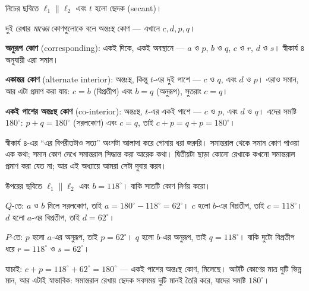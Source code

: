 \documentclass[11pt]{article}
\begin{document}
\begin{idea}[ছেদক ও সমান্তরাল রেখা]
নিচের ছবিতে $\ell_1 \parallel \ell_2$ এবং $t$ হলো ছেদক (secant)।

\begin{center}
\end{center}

\noindent
দুই রেখার \emph{মাঝের} কোণগুলোকে বলে অন্তঃস্থ কোণ --- এখানে $c, d, p, q$।

\textbf{অনুরূপ কোণ} (corresponding): একই দিকে, একই অবস্থানে --- $a$ ও $p$,
$b$ ও $q$, $c$ ও $r$, $d$ ও $s$। স্বীকার্য ৪ অনুযায়ী এরা সমান।

\textbf{একান্তর কোণ} (alternate interior): অন্তঃস্থ, কিন্তু $t$-এর দুই পাশে ---
$c$ ও $q$, এবং $d$ ও $p$। এরাও সমান, আর এটা প্রমাণ করা যায়: $c = b$ (বিপ্রতীপ)
এবং $b = q$ (অনুরূপ), সুতরাং $c = q$।

\textbf{একই পাশের অন্তঃস্থ কোণ} (co-interior): অন্তঃস্থ, $t$-এর একই পাশে ---
$c$ ও $p$, এবং $d$ ও $q$। এদের সমষ্টি $180^\circ$: $p + q = 180^\circ$ (সরলকোণ)
এবং $c = q$, তাই $c + p = q + p = 180^\circ$।
\end{idea}

\begin{remark}
স্বীকার্য ৪-এর ``এর বিপরীতটাও সত্য'' অংশটা আলাদা করে গোনায় ধরা জরুরি। সমান্তরাল
থেকে সমান কোণ পাওয়া এক কথা; সমান কোণ দেখে সমান্তরাল সিদ্ধান্ত করা আরেক কথা।
দ্বিতীয়টা ছাড়া কোনো রেখাকে কখনো সমান্তরাল প্রমাণ করা যেত না; আর এই অধ্যায়ে
আমরা সেটা দুবার করব।
\end{remark}

\begin{example}
উপরের ছবিতে $\ell_1 \parallel \ell_2$ এবং $b = 118^\circ$। বাকি সাতটি কোণ
নির্ণয় করো।
\end{example}

\begin{solbox}
$Q$-তে: $a$ ও $b$ মিলে সরলকোণ, তাই $a = 180^\circ - 118^\circ = 62^\circ$।
$c$ হলো $b$-এর বিপ্রতীপ, তাই $c = 118^\circ$। $d$ হলো $a$-এর বিপ্রতীপ, তাই
$d = 62^\circ$।

$P$-তে: $p$ হলো $a$-এর অনুরূপ, তাই $p = 62^\circ$। $q$ হলো $b$-এর অনুরূপ, তাই
$q = 118^\circ$। বাকি দুটো বিপ্রতীপ ধরে $r = 118^\circ$ ও $s = 62^\circ$।

যাচাই: $c + p = 118^\circ + 62^\circ = 180^\circ$ --- একই পাশের অন্তঃস্থ কোণ,
মিলেছে। আটটি কোণের মাত্র দুটি ভিন্ন মান, আর এটাই স্বাভাবিক: সমান্তরাল রেখায়
ছেদক সবসময় দুটি মানই তৈরি করে, যাদের সমষ্টি $180^\circ$।
\end{solbox}
\end{document}
